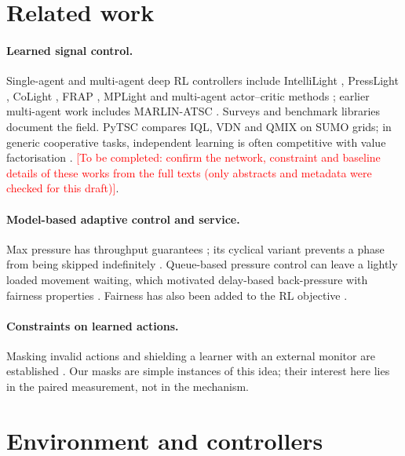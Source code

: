\documentclass[11pt]{article}
\newcommand{\tocomplete}[1]{\textcolor{red}{[To be completed: #1]}}
\begin{document}
\section{Related work}
\paragraph{Learned signal control.}
Single-agent and multi-agent deep RL controllers include IntelliLight \cite{wei2018intellilight},
PressLight \cite{wei2019presslight}, CoLight \cite{wei2019colight}, FRAP \cite{zheng2019frap},
MPLight \cite{chen2020thousand} and multi-agent actor--critic methods \cite{chu2020multiagent}; earlier
multi-agent work includes MARLIN-ATSC \cite{eltantawy2013marlin}. Surveys \cite{haydari2022survey,noaeen2022review}
and benchmark libraries \cite{ault2021resco,mei2024libsignal,bokade2025pytsc} document the field. PyTSC
\cite{bokade2025pytsc} compares IQL, VDN and QMIX on SUMO grids; in generic cooperative tasks, independent
learning is often competitive with value factorisation \cite{papoudakis2021benchmarking}.
\tocomplete{confirm the network, constraint and baseline details of these works from the full texts (only
abstracts and metadata were checked for this draft)}.

\paragraph{Model-based adaptive control and service.}
Max pressure has throughput guarantees \cite{varaiya2013max}; its cyclical variant prevents a phase from
being skipped indefinitely \cite{levin2020cyclical}. Queue-based pressure control can leave a lightly loaded
movement waiting, which motivated delay-based back-pressure with fairness properties \cite{wu2018delay}.
Fairness has also been added to the RL objective \cite{raeis2021fair}.

\paragraph{Constraints on learned actions.}
Masking invalid actions and shielding a learner with an external monitor are established
\cite{huang2022masking,alshiekh2018shielding}. Our masks are simple instances of this idea; their interest
here lies in the paired measurement, not in the mechanism.

\section{Environment and controllers}
\end{document}
